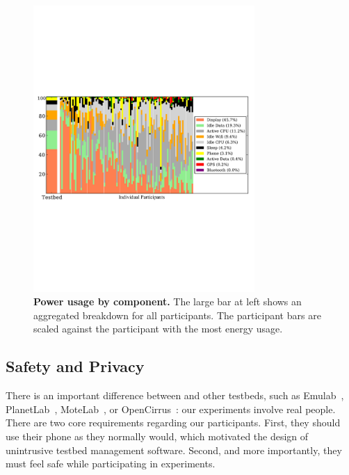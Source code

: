 \begin{figure}[t]

\centering
\includegraphics[width=0.75\textwidth]{./figures/power/breakdown/graph.pdf}

\caption{\textbf{Power usage by component.} The large bar at left shows an
aggregated breakdown for all participants. The participant bars are scaled
against the participant with the most energy usage.}

\vspace*{-0.1in}

\label{figure-batteryoverview}
\end{figure}

\subsection{Safety and Privacy}

There is an important difference between \PhoneLab{} and other testbeds, such
as Emulab~\cite{white:osdi:2002}, PlanetLab~\cite{peterson:ccr:2003},
MoteLab~\cite{werner-allen:ipsn:2005}, or
OpenCirrus~\cite{avetisyan:computer:2010}: our experiments involve real
people. There are two core requirements regarding our participants. First,
they should use their phone as they normally would, which motivated the
design of unintrusive testbed management software. Second, and more
importantly, they must feel safe while participating in \PhoneLab{}
experiments.

